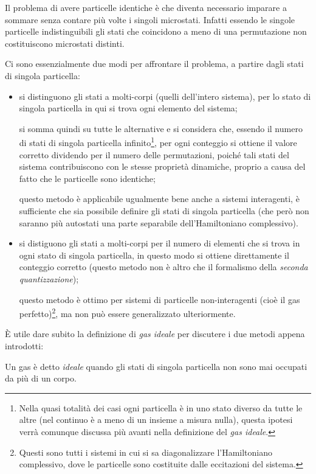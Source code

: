 Il problema di avere particelle identiche è che diventa necessario imparare a sommare senza contare più volte i singoli microstati. Infatti essendo le singole particelle indistinguibili gli stati che coincidono a meno di una permutazione non costituiscono microstati distinti.

Ci sono essenzialmente due modi per affrontare il problema, a partire dagli stati di singola particella:
\begin{itemize}
	\item si distinguono gli stati a molti-corpi (quelli dell'intero sistema), per lo stato di singola particella in qui si trova ogni elemento del sistema;
	
	si somma quindi su tutte le alternative e si considera che, essendo il numero di stati di singola particella infinito\footnote{Nella quasi totalità dei casi ogni particella è in uno stato diverso da tutte le altre (nel continuo è a meno di un insieme a misura nulla), questa ipotesi verrà comunque discussa più avanti nella definizione del \textit{gas ideale}.}, per ogni conteggio si ottiene il valore corretto dividendo per il numero delle permutazioni, poiché tali stati del sistema contribuiscono con le stesse proprietà dinamiche, proprio a causa del fatto che le particelle sono identiche;
	
	questo metodo è applicabile ugualmente bene anche a sistemi interagenti, è sufficiente che sia possibile definire gli stati di singola particella (che però non saranno più autostati una parte separabile dell'Hamiltoniano complessivo).
	
	\item si distiguono gli stati a molti-corpi per il numero di elementi che si trova in ogni stato di singola particella, in questo modo si ottiene direttamente il conteggio corretto (questo metodo non è altro che il formalismo della \textit{seconda quantizzazione});
	
	questo metodo è ottimo per sistemi di particelle non-interagenti (cioè il gas perfetto)\footnote{Questi sono tutti i sistemi in cui si sa diagonalizzare l'Hamiltoniano complessivo, dove le particelle sono costituite dalle eccitazioni del sistema.}, ma non può essere generalizzato ulteriormente.
\end{itemize}

\noindent \`E utile dare subito la definizione di \textit{gas ideale} per discutere i due metodi appena introdotti:

\begin{defn}
	Un gas è detto \textit{ideale} quando gli stati di singola particella non sono mai occupati da più di un corpo.
\end{defn}

